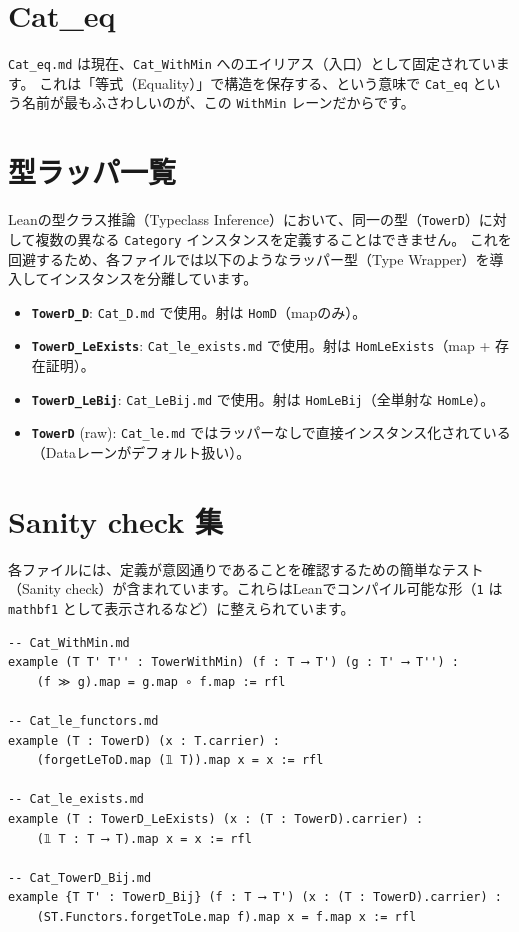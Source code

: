 \documentclass[judge=standard,11pt]{jlreq}
\theoremstyle{definition}
\begin{document}
\section{Cat\_eq}

\texttt{Cat\_eq.md} は現在、\texttt{Cat\_WithMin} へのエイリアス（入口）として固定されています。
これは「等式（Equality）」で構造を保存する、という意味で \texttt{Cat\_eq} という名前が最もふさわしいのが、この \texttt{WithMin} レーンだからです。

\appendix

\section{型ラッパ一覧}

Leanの型クラス推論（Typeclass Inference）において、同一の型（\texttt{TowerD}）に対して複数の異なる \texttt{Category} インスタンスを定義することはできません。
これを回避するため、各ファイルでは以下のようなラッパー型（Type Wrapper）を導入してインスタンスを分離しています。

\begin{itemize}
    \item \textbf{\texttt{TowerD\_D}}: \texttt{Cat\_D.md} で使用。射は \texttt{HomD}（mapのみ）。
    \item \textbf{\texttt{TowerD\_LeExists}}: \texttt{Cat\_le\_exists.md} で使用。射は \texttt{HomLeExists}（map + 存在証明）。
    \item \textbf{\texttt{TowerD\_LeBij}}: \texttt{Cat\_LeBij.md} で使用。射は \texttt{HomLeBij}（全単射な \texttt{HomLe}）。
    \item \textbf{\texttt{TowerD}} (raw): \texttt{Cat\_le.md} ではラッパーなしで直接インスタンス化されている（Dataレーンがデフォルト扱い）。
\end{itemize}

\section{Sanity check 集}

各ファイルには、定義が意図通りであることを確認するための簡単なテスト（Sanity check）が含まれています。これらはLeanでコンパイル可能な形（\texttt{1} は \texttt{\\mathbf{1}} として表示されるなど）に整えられています。

\begin{lstlisting}
-- Cat_WithMin.md
example (T T' T'' : TowerWithMin) (f : T ⟶ T') (g : T' ⟶ T'') :
    (f ≫ g).map = g.map ∘ f.map := rfl

-- Cat_le_functors.md
example (T : TowerD) (x : T.carrier) :
    (forgetLeToD.map (𝟙 T)).map x = x := rfl

-- Cat_le_exists.md
example (T : TowerD_LeExists) (x : (T : TowerD).carrier) :
    (𝟙 T : T ⟶ T).map x = x := rfl

-- Cat_TowerD_Bij.md
example {T T' : TowerD_Bij} (f : T ⟶ T') (x : (T : TowerD).carrier) :
    (ST.Functors.forgetToLe.map f).map x = f.map x := rfl
\end{lstlisting}
\end{document}
